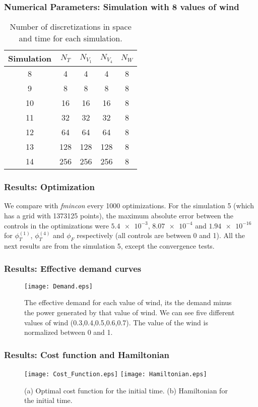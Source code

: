 \documentclass[aspectratio=169]{beamer}\usepackage[utf8]{inputenc}
\begin{document}
\begin{frame}\frametitle{Numerical Parameters: Simulation with 8 values of wind}
\begin{table}[]
\begin{tabular}{ccccc}
\toprule
Simulation & $N_T$ & $N_{V_1}$ & $N_{V_4}$ & $N_W$ \\ \midrule
8 & 4 & 4 & 4 & 8 \\
9 & 8 & 8 & 8 & 8 \\
10 & 16 & 16 & 16 & 8 \\
11 & 32 & 32 & 32 & 8 \\
12 & 64 & 64 & 64 & 8 \\
13 & 128 & 128 & 128 & 8 \\
14 & 256 & 256 & 256 & 8 \\ \bottomrule
\end{tabular}
\caption{Number of discretizations in space and time for each simulation.}
\label{Table_2}
\end{table}
\end{frame}

\begin{frame}\frametitle{Results: Optimization}
We compare with \emph{fmincon} every 1000 optimizations. For the simulation 5 (which has a grid with 1373125 points), the maximum absolute error between the controls in the optimizations were $\num{5.4e-3}$, $\num{8.07e-4}$ and $\num{1.94e-16}$ for $\phi_T^{(1)}$, $\phi_T^{(4)}$ and $\phi_F$ respectively (all controls are between 0 and 1). All the next results are from the simulation 5, except the convergence tests.
\end{frame}

\begin{frame}\frametitle{Results: Effective demand curves}
\begin{figure}[h!]
\centering
\texttt{[image: Demand.eps]}
\caption{The effective demand for each value of wind, its the demand minus the power generated by that value of wind. We can see five different values of wind (0.3,0.4,0.5,0.6,0.7). The value of the wind is normalized between 0 and 1.}
\end{figure}
\end{frame}

\begin{frame}\frametitle{Results: Cost function and Hamiltonian}
\begin{figure}[ht!]
\centering
\subfigure
{\texttt{[image: Cost\_Function.eps]}}
\qquad
\subfigure
{\texttt{[image: Hamiltonian.eps]}}
\caption
{(a) Optimal cost function for the initial time. (b) Hamiltonian for the initial time.}
\end{figure}
\end{frame}
\end{document}
